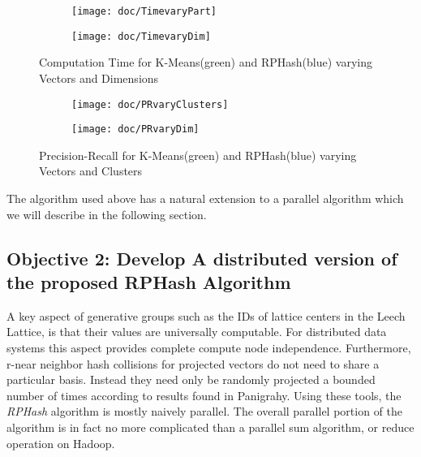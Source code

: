 \documentclass[a4paper,10pt]{article}
\begin{document}
\begin{figure}
        \centering
        \begin{subfigure}[b]{0.49\textwidth}
                \texttt{[image: doc/TimevaryPart]}
                \label{TimePart}
        \end{subfigure}
        \begin{subfigure}[b]{0.49\textwidth}
                \texttt{[image: doc/TimevaryDim]}
                \label{TimeDim}
        \end{subfigure}
	  \caption{Computation Time for K-Means(green) and RPHash(blue) varying Vectors and Dimensions}\label{timecomplex}
\end{figure}

\begin{figure}
        \centering
        \begin{subfigure}[b]{0.49\textwidth}
                \texttt{[image: doc/PRvaryClusters]}
                \label{PRaccClu}
        \end{subfigure}
        \begin{subfigure}[b]{0.49\textwidth}
                \texttt{[image: doc/PRvaryDim]}
                \label{PRaccDim}
        \end{subfigure}
	 \caption{Precision-Recall for K-Means(green) and RPHash(blue) varying Vectors and Clusters}\label{praccuracy}
\end{figure}


The algorithm used above has a natural extension to a parallel algorithm
which we will describe in the following section.\\

\subsection{Objective 2:  Develop A distributed version of the proposed RPHash Algorithm}
A key aspect of generative groups such as the IDs of lattice centers in the Leech Lattice, is that their 
values are universally computable. For distributed data systems this aspect provides complete
compute node independence. Furthermore,  r-near neighbor hash collisions for projected vectors
do not need to share a particular basis. Instead they need only be randomly projected a bounded number of
times according to results found in Panigrahy\cite{panigrahy}.
Using these tools, the \emph{RPHash} algorithm
is mostly naively parallel. The overall parallel portion of the algorithm is in fact no
more complicated than a
parallel sum algorithm, or reduce operation on Hadoop. 
\end{document}
